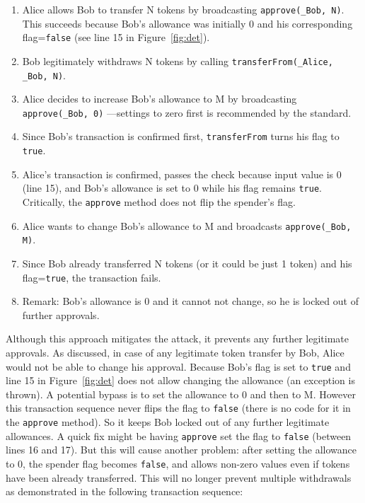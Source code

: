 \begin{enumerate}
	\item Alice allows Bob to transfer N tokens by broadcasting \texttt{approve(\_Bob, N)}. This succeeds because Bob’s allowance was initially 0 and his corresponding flag=\texttt{false} (see line 15 in Figure~\ref{fig:det}).
	\item Bob legitimately withdraws N tokens by calling \texttt{transferFrom(\_Alice, \_Bob, N)}.
	\item Alice decides to increase Bob's allowance to M by broadcasting \texttt{approve(\_Bob, 0)} ---settings to zero first is recommended by the standard.
	\item Since Bob's transaction is confirmed first, \texttt{transferFrom} turns his flag to \texttt{true}.
	\item Alice’s transaction is confirmed, passes the check because input value is 0 (line 15), and Bob’s allowance is set to 0 while his flag remains \texttt{true}. Critically, the \texttt{approve} method does not flip the spender's flag.
	\item Alice wants to change Bob’s allowance to M and broadcasts \texttt{approve(\_Bob, M)}. 
	\item Since Bob already transferred N tokens (or it could be just 1 token) and his flag=\texttt{true}, the transaction fails.
	\item Remark: Bob’s allowance is 0 and it cannot not change, so he is locked out of further approvals.
\end{enumerate}

Although this approach mitigates the attack, it prevents any further legitimate approvals. As discussed, in case of any legitimate token transfer by Bob, Alice would not be able to change his approval. Because Bob's flag is set to \texttt{true} and line 15 in Figure~\ref{fig:det} does not allow changing the allowance (an exception is thrown). A potential bypass is to set the allowance to 0 and then to M. However this transaction sequence never flips the flag to \texttt{false} (there is no code for it in the \texttt{approve} method). So it keeps Bob locked out of any further legitimate allowances. A quick fix might be having \texttt{approve} set the flag to \texttt{false} (\ie between lines 16 and 17). But this will cause another problem: after setting the allowance to 0, the spender flag becomes \texttt{false}, and allows non-zero values even if tokens have been already transferred. This will no longer prevent multiple withdrawals as demonstrated in the following transaction sequence:

